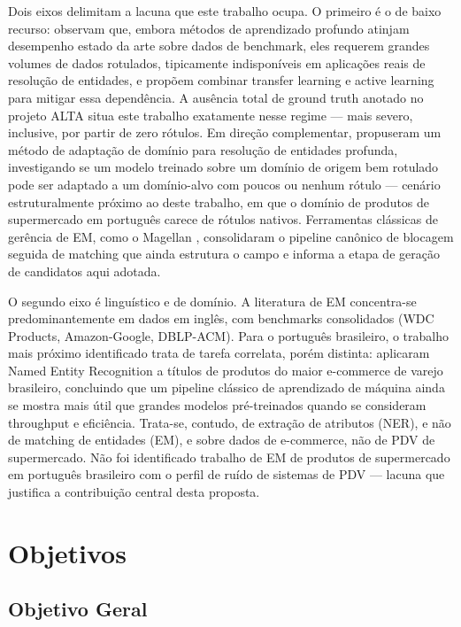 \documentclass[
    article,
    12pt,
    oneside,
    a4paper,
    english,
    brazilian
    ]{abntex2}
\numberwithin{equation}{section}
\begin{document}
Dois eixos delimitam a lacuna que este trabalho ocupa. O primeiro é o de baixo recurso:  observam que, embora métodos de aprendizado profundo atinjam desempenho estado da arte sobre dados de benchmark, eles requerem grandes volumes de dados rotulados, tipicamente indisponíveis em aplicações reais de resolução de entidades, e propõem combinar transfer learning e active learning para mitigar essa dependência. A ausência total de ground truth anotado no projeto ALTA situa este trabalho exatamente nesse regime --- mais severo, inclusive, por partir de zero rótulos. Em direção complementar,  propuseram um método de adaptação de domínio para resolução de entidades profunda, investigando se um modelo treinado sobre um domínio de origem bem rotulado pode ser adaptado a um domínio-alvo com poucos ou nenhum rótulo --- cenário estruturalmente próximo ao deste trabalho, em que o domínio de produtos de supermercado em português carece de rótulos nativos. Ferramentas clássicas de gerência de EM, como o Magellan \cite{konda2016}, consolidaram o pipeline canônico de blocagem seguida de matching que ainda estrutura o campo e informa a etapa de geração de candidatos aqui adotada.

O segundo eixo é linguístico e de domínio. A literatura de EM concentra-se predominantemente em dados em inglês, com benchmarks consolidados (WDC Products, Amazon-Google, DBLP-ACM). Para o português brasileiro, o trabalho mais próximo identificado trata de tarefa correlata, porém distinta:  aplicaram Named Entity Recognition a títulos de produtos do maior e-commerce de varejo brasileiro, concluindo que um pipeline clássico de aprendizado de máquina ainda se mostra mais útil que grandes modelos pré-treinados quando se consideram throughput e eficiência. Trata-se, contudo, de extração de atributos (NER), e não de matching de entidades (EM), e sobre dados de e-commerce, não de PDV de supermercado. Não foi identificado trabalho de EM de produtos de supermercado em português brasileiro com o perfil de ruído de sistemas de PDV --- lacuna que justifica a contribuição central desta proposta.

\section{Objetivos}

\subsection{Objetivo Geral}
\end{document}

